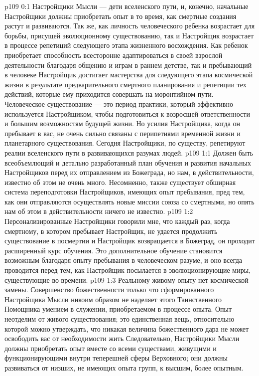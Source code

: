 \vs p109 0:1 Настройщики Мысли --- дети вселенского пути, и, конечно, начальные Настройщики должны приобретать опыт в то время, как смертные создания растут и развиваются. Так же, как личность человеческого ребенка возрастает для борьбы, присущей эволюционному существованию, так и Настройщик возрастает в процессе репетиций следующего этапа жизненного восхождения. Как ребенок приобретает способность всесторонне адаптироваться в своей взрослой деятельности благодаря общению и играм в раннем детстве, так и пребывающий в человеке Настройщик достигает мастерства для следующего этапа космической жизни в результате предварительного смертного планирования и репетиции тех действий, которые ему приходится совершать на моронтийном пути. Человеческое существование --- это период практики, который эффективно используется Настройщиком, чтобы подготовиться к возросшей ответственности и большим возможностям будущей жизни. Но усилия Настройщика, когда он пребывает в вас, не очень сильно связаны с перипетиями временной жизни и планетарного существования. Сегодня Настройщики, по существу, репетируют реалии вселенского пути в развивающихся разумах людей.
\vs p109 1:1 Должен быть всеобъемлющий и детально разработанный план обучения и развития начальных Настройщиков перед их отправлением из Божеграда, но нам, в действительности, известно об этом не очень много. Несомненно, также существует обширная система переподготовки Настройщиков, имеющих опыт пребывания, пред тем, как они отправляются осуществлять новые миссии союза со смертными, но опять нам об этом в действительности ничего не известно.
\vs p109 1:2 Персонализированные Настройщики говорили мне, что каждый раз, когда смертному, в котором пребывает Настройщик, не удается продолжить существование в посмертии и Настройщик возвращается в Божеград, он проходит расширенный курс обучения. Это дополнительное обучение становится возможным благодаря опыту пребывания в человеческом разуме, и оно всегда проводится перед тем, как Настройщик посылается в эволюционирующие миры, существующие во времени.
\vs p109 1:3 Реальному живому опыту нет космической замены. Совершенство божественности только что сформированного Настройщика Мысли никоим образом не наделяет этого Таинственного Помощника умением в служении, приобретаемом в процессе опыта. Опыт неотделим от живого существования; это единственная вещь, относительно которой можно утверждать, что никакая величина божественного дара не может освободить вас от необходимости жить  Следовательно, Настройщики Мысли должны приобретать опыт вместе со всеми существами, живущими и функционирующими внутри теперешней сферы Верховного; они должны развиваться от низших, не имеющих опыта групп, к высшим, более опытным.
